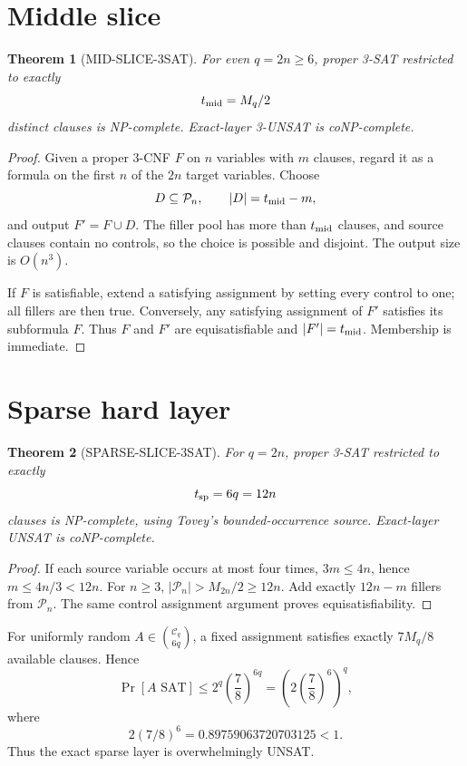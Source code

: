 \documentclass[11pt]{article}
\newtheorem{theorem}{Theorem}
\begin{document}
\section{Middle slice}
\begin{theorem}[MID-SLICE-3SAT]
For even \(q=2n\ge6\), proper 3-SAT restricted to exactly
\[
t_{\rm mid}=M_q/2
\]
distinct clauses is NP-complete. Exact-layer 3-UNSAT is coNP-complete.
\end{theorem}
\begin{proof}
Given a proper 3-CNF \(F\) on \(n\) variables with \(m\) clauses, regard it as a formula on the first \(n\) of the \(2n\) target variables. Choose
\[
D\subseteq\mathcal P_n,\qquad |D|=t_{\rm mid}-m,
\]
and output \(F'=F\cup D\). The filler pool has more than \(t_{\rm mid}\) clauses, and source clauses contain no controls, so the choice is possible and disjoint. The output size is \(O(n^3)\).

If \(F\) is satisfiable, extend a satisfying assignment by setting every control to one; all fillers are then true. Conversely, any satisfying assignment of \(F'\) satisfies its subformula \(F\). Thus \(F\) and \(F'\) are equisatisfiable and \(|F'|=t_{\rm mid}\). Membership is immediate.
\end{proof}

\section{Sparse hard layer}
\begin{theorem}[SPARSE-SLICE-3SAT]
For \(q=2n\), proper 3-SAT restricted to exactly
\[
t_{\rm sp}=6q=12n
\]
clauses is NP-complete, using Tovey's bounded-occurrence source. Exact-layer UNSAT is coNP-complete.
\end{theorem}
\begin{proof}
If each source variable occurs at most four times, \(3m\le4n\), hence \(m\le4n/3<12n\). For \(n\ge3\), \(|\mathcal P_n|>M_{2n}/2\ge12n\). Add exactly \(12n-m\) fillers from \(\mathcal P_n\). The same control assignment argument proves equisatisfiability.
\end{proof}

For uniformly random \(A\in\binom{\mathcal C_q}{6q}\), a fixed assignment satisfies exactly \(7M_q/8\) available clauses. Hence
\[
\Pr[A\text{ SAT}]
\le2^q\left(\frac78\right)^{6q}
=\left(2\left(\frac78\right)^6\right)^q,
\]
where
\[
2(7/8)^6=0.89759063720703125<1.
\]
Thus the exact sparse layer is overwhelmingly UNSAT.
\end{document}
